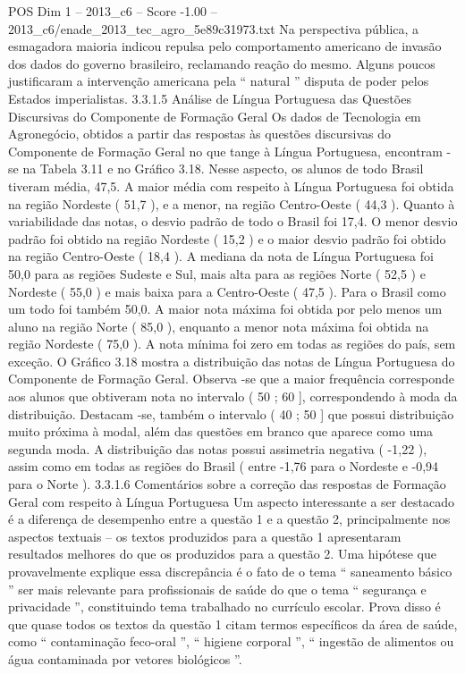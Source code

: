 \begin{textsample}{POS Dim 1 – 2013\_c6 – Score -1.00 – 2013\_c6/enade\_2013\_tec\_agro\_5e89c31973.txt}
Na perspectiva pública, a esmagadora maioria indicou repulsa pelo comportamento americano de invasão dos dados do governo brasileiro, reclamando reação do mesmo.
Alguns poucos justificaram a intervenção americana pela “ natural ” disputa de poder pelos Estados imperialistas. 3.3.1.5 Análise de Língua Portuguesa das Questões Discursivas do Componente de Formação Geral Os dados de Tecnologia em Agronegócio, obtidos a partir das respostas às questões discursivas do Componente de Formação Geral no que tange à Língua Portuguesa, encontram -se na Tabela 3.11 e no Gráfico 3.18.
Nesse aspecto, os alunos de todo Brasil tiveram média, 47,5.
A maior média com respeito à Língua Portuguesa foi obtida na região Nordeste ( 51,7 ), e a menor, na região Centro-Oeste ( 44,3 ).
Quanto à variabilidade das notas, o desvio padrão de todo o Brasil foi 17,4.
O menor desvio padrão foi obtido na região Nordeste ( 15,2 ) e o maior desvio padrão foi obtido na região Centro-Oeste ( 18,4 ).
A mediana da nota de Língua Portuguesa foi 50,0 para as regiões Sudeste e Sul, mais alta para as regiões Norte ( 52,5 ) e Nordeste ( 55,0 ) e mais baixa para a Centro-Oeste ( 47,5 ).
Para o Brasil como um todo foi também 50,0.
A maior nota máxima foi obtida por pelo menos um aluno na região Norte ( 85,0 ), enquanto a menor nota máxima foi obtida na região Nordeste ( 75,0 ).
A nota mínima foi zero em todas as regiões do país, sem exceção.
O Gráfico 3.18 mostra a distribuição das notas de Língua Portuguesa do Componente de Formação Geral.
Observa -se que a maior frequência corresponde aos alunos que obtiveram nota no intervalo ( 50 ; 60 ], correspondendo à moda da distribuição.
Destacam -se, também o intervalo ( 40 ; 50 ] que possui distribuição muito próxima à modal, além das questões em branco que aparece como uma segunda moda.
A distribuição das notas possui assimetria negativa ( -1,22 ), assim como em todas as regiões do Brasil ( entre -1,76 para o Nordeste e -0,94 para o Norte ). 3.3.1.6 Comentários sobre a correção das respostas de Formação Geral com respeito à Língua Portuguesa Um aspecto interessante a ser destacado é a diferença de desempenho entre a questão 1 e a questão 2, principalmente nos aspectos textuais – os textos produzidos para a questão 1 apresentaram resultados melhores do que os produzidos para a questão 2.
Uma hipótese que provavelmente explique essa discrepância é o fato de o tema “ saneamento básico ” ser mais relevante para profissionais de saúde do que o tema “ segurança e privacidade ”, constituindo tema trabalhado no currículo escolar.
Prova disso é que quase todos os textos da questão 1 citam termos específicos da área de saúde, como “ contaminação feco-oral ”, “ higiene corporal ”, “ ingestão de alimentos ou água contaminada por vetores biológicos ”.

\end{textsample}
